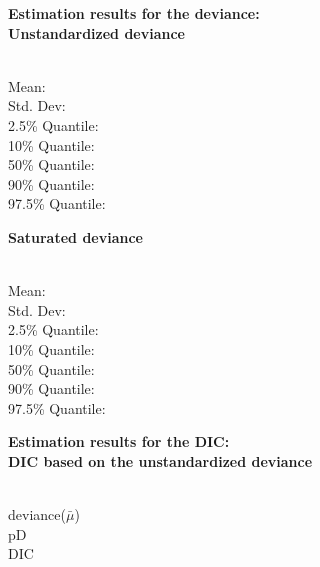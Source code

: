 \documentclass[a4paper, 12pt]{article}
\begin{document}
 {\bf \large Estimation results for the deviance: }\\ 

{\bf Unstandardized deviance } 

\vspace{-0.4cm}
\begin{tabbing}
\hspace{3cm} \= \\
  Mean:            \\
  Std. Dev:        \\
  2.5\% Quantile:   \\
  10\% Quantile:   \\
  50\% Quantile:   \\
  90\% Quantile:   \\
  97.5\% Quantile:   \\
\end{tabbing}

{\bf Saturated deviance } 

\vspace{-0.4cm}
\begin{tabbing}
\hspace{3cm} \= \\
  Mean:            \\
  Std. Dev:        \\
  2.5\% Quantile:   \\
  10\% Quantile:   \\
  50\% Quantile:   \\
  90\% Quantile:   \\
  97.5\% Quantile:   \\
\end{tabbing}


 {\bf \large Estimation results for the DIC: }\\ 

{\bf DIC based on the unstandardized deviance } 

\vspace{-0.4cm}
\begin{tabbing}
\hspace{3cm} \= \\
deviance($\bar{\mu}$)  \\
pD   \\
DIC   \\
\end{tabbing}
\end{document}
